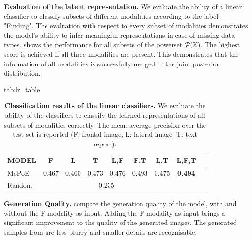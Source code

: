 \documentclass{midl} %
\begin{document}
\textbf{Evaluation of the latent representation.} We evaluate the ability of a linear classifier to classify subsets of different modalities according to the label "Finding". The evaluation with respect to every subset of modalities demonstrates the model's ability to infer meaningful representations in case of missing data types. 
 shows the performance for all subsets of the powerset $\mathcal{P}(\mathbb{X})$. %
The highest score is achieved if all three modalities are present.
This demonstrates that the information of all modalities is successfully merged in the joint posterior distribution.  
\begin{table}[htbp]
\floatconts
  {tab:lr_table}%
  {\caption{\textbf{Classification results of the linear classifiers.}
  We evaluate the ability of the classifiers to classify the learned representations of all subsets of modalities correctly.
  The mean average precision over the test set is reported (F: frontal image, L: lateral image, T: text report). 
  }}%
  {\begin{tabular}{lcccccccc}
            MODEL    & F     & L     & T     & L,F   & F,T   & L,T   & L,F,T          \\
            \hline
            MoPoE  & 0.467 & 0.460 & 0.473 & 0.476 & 0.493 & 0.475 & \textbf{0.494} \\
            Random &  \multicolumn{6}{c}{0.235}
        \end{tabular}}
\end{table}

\textbf{Generation Quality.}  compare the generation quality of the model, with and without the F modality as input.
Adding the F modality as input brings a significant improvement to the quality of the generated images.
The generated samples from  are less blurry and smaller details are recognisable.
\end{document}
